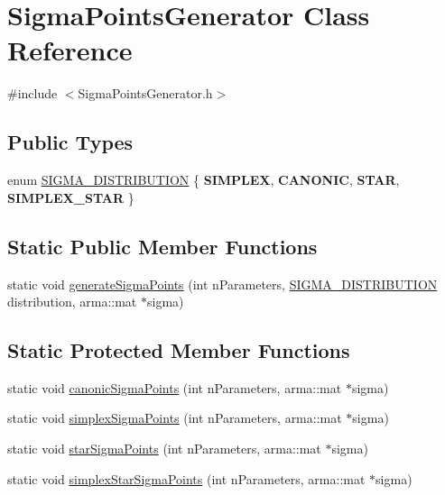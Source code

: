 \hypertarget{classSigmaPointsGenerator}{}\section{Sigma\+Points\+Generator Class Reference}
\label{classSigmaPointsGenerator}


{\ttfamily \#include $<$Sigma\+Points\+Generator.\+h$>$}

\subsection*{Public Types}
\begin{DoxyCompactItemize}
\item 
enum \mbox{\hyperlink{classSigmaPointsGenerator_ad6f9474c0313425a10add120e0acf944}{S\+I\+G\+M\+A\+\_\+\+D\+I\+S\+T\+R\+I\+B\+U\+T\+I\+ON}} \{ {\bfseries S\+I\+M\+P\+L\+EX}, 
{\bfseries C\+A\+N\+O\+N\+IC}, 
{\bfseries S\+T\+AR}, 
{\bfseries S\+I\+M\+P\+L\+E\+X\+\_\+\+S\+T\+AR}
 \}
\end{DoxyCompactItemize}
\subsection*{Static Public Member Functions}
\begin{DoxyCompactItemize}
\item 
static void \mbox{\hyperlink{classSigmaPointsGenerator_a72a2e6479c0d9e458bad143ea67093ba}{generate\+Sigma\+Points}} (int n\+Parameters, \mbox{\hyperlink{classSigmaPointsGenerator_ad6f9474c0313425a10add120e0acf944}{S\+I\+G\+M\+A\+\_\+\+D\+I\+S\+T\+R\+I\+B\+U\+T\+I\+ON}} distribution, arma\+::mat $\ast$sigma)
\end{DoxyCompactItemize}
\subsection*{Static Protected Member Functions}
\begin{DoxyCompactItemize}
\item 
static void \mbox{\hyperlink{classSigmaPointsGenerator_a9c6bab6d0253b217488a04d65853e585}{canonic\+Sigma\+Points}} (int n\+Parameters, arma\+::mat $\ast$sigma)
\item 
static void \mbox{\hyperlink{classSigmaPointsGenerator_a565e88c8abc4d82fc4c6aed75f9693a9}{simplex\+Sigma\+Points}} (int n\+Parameters, arma\+::mat $\ast$sigma)
\item 
static void \mbox{\hyperlink{classSigmaPointsGenerator_a4187ef53aff978a7f2874533ce2fb0f1}{star\+Sigma\+Points}} (int n\+Parameters, arma\+::mat $\ast$sigma)
\item 
static void \mbox{\hyperlink{classSigmaPointsGenerator_aecd82749d0e9865e6abfb9b8410b9542}{simplex\+Star\+Sigma\+Points}} (int n\+Parameters, arma\+::mat $\ast$sigma)
\end{DoxyCompactItemize}
